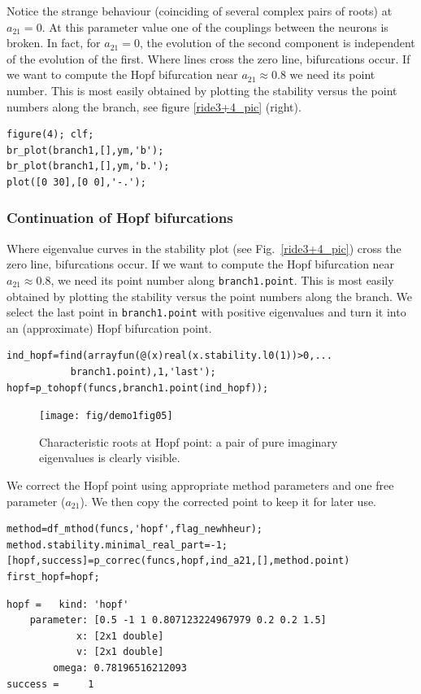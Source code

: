 \documentclass[10pt]{scrartcl}
\newcommand{\blist}[1]{\mbox{\lstinline!#1!}}
\begin{document}
Notice the strange behaviour (coinciding of several complex pairs
of roots) at $a_{21}=0$. At this parameter value
one of the couplings between the neurons is broken.
In fact, for $a_{21}=0$, the evolution of the second component is independent of
the evolution of the first. 
Where lines cross the zero line, bifurcations occur. If we want to 
compute the Hopf bifurcation near $a_{21}\approx0.8$ we need its point
number. This is most easily obtained by plotting the stability versus
the point numbers along the branch, see figure \ref{ride3+4_pic} (right).
\begin{lstlisting}
figure(4); clf;
br_plot(branch1,[],ym,'b');
br_plot(branch1,[],ym,'b.');
plot([0 30],[0 0],'-.');
\end{lstlisting}

\subsubsection{Continuation of Hopf bifurcations}
\label{sec:hopf}
Where eigenvalue curves in the stability plot (see
Fig.~\ref{ride3+4_pic}) cross the zero line, bifurcations occur. If we
want to compute the Hopf bifurcation near $a_{21}\approx0.8$, we need
its point number along \blist{branch1.point}. This is most easily
obtained by plotting the stability versus the point numbers along the
branch. We select the last point in \blist{branch1.point} with
positive eigenvalues and turn it into an (approximate) Hopf
bifurcation point. 
\begin{lstlisting} 
ind_hopf=find(arrayfun(@(x)real(x.stability.l0(1))>0,...
           branch1.point),1,'last');
hopf=p_tohopf(funcs,branch1.point(ind_hopf));
\end{lstlisting}
\begin{figure}[h]
\begin{center}
  \texttt{[image: fig/demo1fig05]}
\end{center}
\caption{\label{ride5_pic}Characteristic roots at Hopf
point: a pair of pure imaginary eigenvalues is clearly visible.} 
\end{figure}
We correct the Hopf point using appropriate method parameters
and one free parameter ($a_{21}$). We then copy the corrected point
to keep it for later use.
\begin{lstlisting}
method=df_mthod(funcs,'hopf',flag_newhheur); 
method.stability.minimal_real_part=-1;
[hopf,success]=p_correc(funcs,hopf,ind_a21,[],method.point)
first_hopf=hopf;                   
\end{lstlisting}
{\small
\begin{verbatim}
hopf =   kind: 'hopf'
    parameter: [0.5 -1 1 0.807123224967979 0.2 0.2 1.5]
            x: [2x1 double]
            v: [2x1 double]
        omega: 0.78196516212093
success =     1
\end{verbatim}
}
\end{document}
